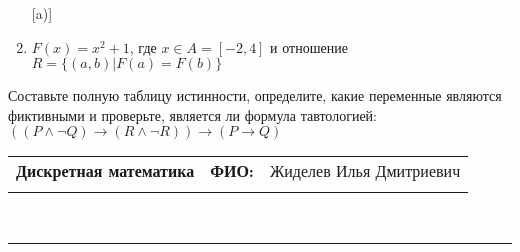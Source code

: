 \documentclass[10pt]{exam}
\newcommand{\class}{Дискретная математика}
\newcommand{\examdate}{}
\begin{document}
\begin{questions}
\begin{enumerate} [a)]
\item $F(x)=x^{2}+1$, где $x \in A = [-2, 4]$ и отношение $R = \{(a,b)|F(a) = F(b)\}$
\end{enumerate}\question Составьте полную таблицу истинности, определите, какие переменные являются фиктивными и проверьте, является ли формула тавтологией:
$(( P \land \neg Q) \rightarrow (R \land \neg R)) \rightarrow (P \rightarrow Q)$

\end{questions}
\newpage
\begin{flushright}
\begin{tabular}{p{2.8in} r l}
\textbf{\class} & \textbf{ФИО:} &Жиделев Илья Дмитриевич
\\

\textbf{\examdate} &&\\
\end{tabular}\\
\end{flushright}
\rule[1ex]{\textwidth}{.1pt}
\end{document}
